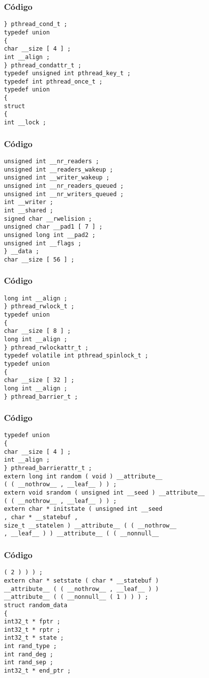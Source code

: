 \documentclass{beamer}
\begin{document}
\begin{frame}[fragile]
\frametitle{C\'odigo}
\begin{verbatim}
} pthread_cond_t ; 
typedef union 
{ 
char __size [ 4 ] ; 
int __align ; 
} pthread_condattr_t ; 
typedef unsigned int pthread_key_t ; 
typedef int pthread_once_t ; 
typedef union 
{ 
struct 
{ 
int __lock ; 
\end{verbatim}
\end{frame}
\begin{frame}[fragile]
\frametitle{C\'odigo}
\begin{verbatim}
unsigned int __nr_readers ; 
unsigned int __readers_wakeup ; 
unsigned int __writer_wakeup ; 
unsigned int __nr_readers_queued ; 
unsigned int __nr_writers_queued ; 
int __writer ; 
int __shared ; 
signed char __rwelision ; 
unsigned char __pad1 [ 7 ] ; 
unsigned long int __pad2 ; 
unsigned int __flags ; 
} __data ; 
char __size [ 56 ] ; 
\end{verbatim}
\end{frame}
\begin{frame}[fragile]
\frametitle{C\'odigo}
\begin{verbatim}
long int __align ; 
} pthread_rwlock_t ; 
typedef union 
{ 
char __size [ 8 ] ; 
long int __align ; 
} pthread_rwlockattr_t ; 
typedef volatile int pthread_spinlock_t ; 
typedef union 
{ 
char __size [ 32 ] ; 
long int __align ; 
} pthread_barrier_t ; 
\end{verbatim}
\end{frame}
\begin{frame}[fragile]
\frametitle{C\'odigo}
\begin{verbatim}
typedef union 
{ 
char __size [ 4 ] ; 
int __align ; 
} pthread_barrierattr_t ; 
extern long int random ( void ) __attribute__ 
( ( __nothrow__ , __leaf__ ) ) ; 
extern void srandom ( unsigned int __seed ) __attribute__ 
( ( __nothrow__ , __leaf__ ) ) ; 
extern char * initstate ( unsigned int __seed 
, char * __statebuf , 
size_t __statelen ) __attribute__ ( ( __nothrow__ 
, __leaf__ ) ) __attribute__ ( ( __nonnull__ 
\end{verbatim}
\end{frame}
\begin{frame}[fragile]
\frametitle{C\'odigo}
\begin{verbatim}
( 2 ) ) ) ; 
extern char * setstate ( char * __statebuf ) 
__attribute__ ( ( __nothrow__ , __leaf__ ) ) 
__attribute__ ( ( __nonnull__ ( 1 ) ) ) ; 
struct random_data 
{ 
int32_t * fptr ; 
int32_t * rptr ; 
int32_t * state ; 
int rand_type ; 
int rand_deg ; 
int rand_sep ; 
int32_t * end_ptr ; 
\end{verbatim}
\end{frame}
\end{document}

